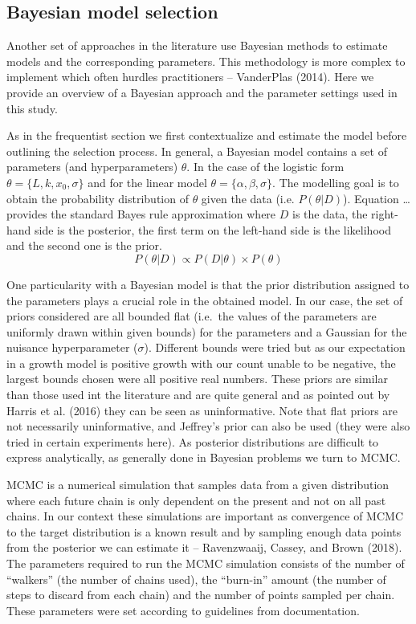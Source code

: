 \documentclass[]{article}
\begin{document}
\hypertarget{bayesian-model-selection}{%
\subsection{Bayesian model selection}\label{bayesian-model-selection}}

Another set of approaches in the literature use Bayesian methods to
estimate models and the corresponding parameters. This methodology is
more complex to implement which often hurdles practitioners --
VanderPlas (2014). Here we provide an overview of a Bayesian approach
and the parameter settings used in this study.

As in the frequentist section we first contextualize and estimate the
model before outlining the selection process. In general, a Bayesian
model contains a set of parameters (and hyperparameters) \(\theta\). In
the case of the logistic form \(\theta = \{L, k, x_0, \sigma\}\) and for
the linear model \(\theta = \{\alpha, \beta, \sigma\}\). The modelling
goal is to obtain the probability distribution of \(\theta\) given the
data (i.e. \(P(\theta|D)\)). Equation \ldots{} provides the standard
Bayes rule approximation where \(D\) is the data, the right-hand side is
the posterior, the first term on the left-hand side is the likelihood
and the second one is the prior.
\[P(\theta|D) \propto P(D|\theta) \times P(\theta)\]

One particularity with a Bayesian model is that the prior distribution
assigned to the parameters plays a crucial role in the obtained model.
In our case, the set of priors considered are all bounded flat (i.e.~the
values of the parameters are uniformly drawn within given bounds) for
the parameters and a Gaussian for the nuisance hyperparameter
(\(\sigma\)). Different bounds were tried but as our expectation in a
growth model is positive growth with our count unable to be negative,
the largest bounds chosen were all positive real numbers. These priors
are similar than those used int the literature and are quite general and
as pointed out by Harris et al. (2016) they can be seen as
uninformative. Note that flat priors are not necessarily uninformative,
and Jeffrey's prior can also be used (they were also tried in certain
experiments here). As posterior distributions are difficult to express
analytically, as generally done in Bayesian problems we turn to MCMC.

MCMC is a numerical simulation that samples data from a given
distribution where each future chain is only dependent on the present
and not on all past chains. In our context these simulations are
important as convergence of MCMC to the target distribution is a known
result and by sampling enough data points from the posterior we can
estimate it -- Ravenzwaaij, Cassey, and Brown (2018). The parameters
required to run the MCMC simulation consists of the number of
``walkers'' (the number of chains used), the ``burn-in'' amount (the
number of steps to discard from each chain) and the number of points
sampled per chain. These parameters were set according to guidelines
from documentation.
\end{document}
